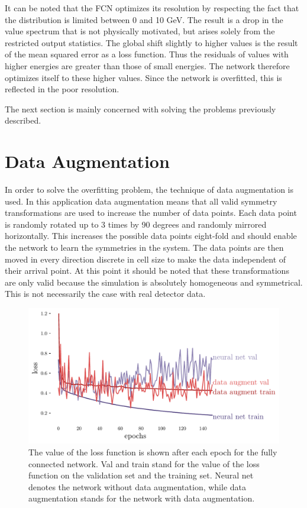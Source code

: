\documentclass[12pt, a4paper]{thesis}
\begin{document}
It can be noted that the FCN optimizes its resolution by respecting
the fact that the distribution is limited between 0 and 10 GeV. The
result is a drop in the value spectrum that is not physically
motivated, but arises solely from the restricted output statistics.
The global shift slightly to higher values is the result of the mean
squared error as a loss function. Thus the residuals of values with
higher energies are greater than those of small energies. The network
therefore optimizes itself to these higher values. Since the network
is overfitted, this is reflected in the poor resolution.

The next section is mainly concerned with solving the problems
previously described.

\section{Data Augmentation}
\label{sec:org4a347fb}

In order to solve the overfitting problem, the technique of data
augmentation is used. In this application data augmentation means that
all valid symmetry transformations are used to increase the number of
data points. Each data point is randomly rotated up to 3 times by 90
degrees and randomly mirrored horizontally. This increases the
possible data points eight-fold and should enable the network to learn
the symmetries in the system. The data points are then moved in every
direction discrete in cell size to make the data independent of their
arrival point. At this point it should be noted that these
transformations are only valid because the simulation is absolutely
homogeneous and symmetrical. This is not necessarily the case with
real detector data.

\begin{figure}[hbtp]
  \centering
  \includegraphics[width=.9\linewidth]{../images/data_augment_loss.pdf}
  \caption{The value of the loss function is shown after each epoch
    for the fully connected network. Val and train stand for the value
    of the loss function on the validation set and the training
    set. Neural net denotes the network without data augmentation,
    while data augmentation stands for the network with data
    augmentation.}
  \label{da_loss}
\end{figure} 
\end{document}

